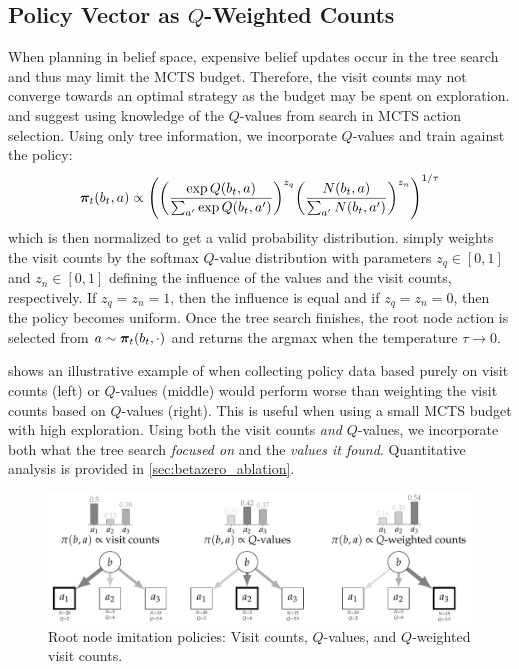 \subsection{Policy Vector as \texorpdfstring{$Q$}{Q}-Weighted Counts}
When planning in belief space, expensive belief updates occur in the tree search and thus may limit the MCTS budget.
Therefore, the visit counts may not converge towards an optimal strategy as the budget may be spent on exploration.
\textcite{danihelka2022policy} and \textcite{czech2021improving} suggest using knowledge of the $Q$-values from search in MCTS action selection.
Using only tree information, we incorporate $Q$-values and train against the policy:
\begin{equation}
    \boldsymbol\pi_t(b_t, a) \propto \Biggl(\biggl(\frac{\exp Q(b_t, a)}{\sum_{a'} \exp Q(b_t, a')}\biggr)^{z_q}\biggl(\frac{N(b_t,a)}{\sum_{a'} N(b_t,a')}\biggr)^{z_n}\Biggr)^{1/\tau}\label{eq:policy_q_weight}
\end{equation}
which is then normalized to get a valid probability distribution.
 simply weights the visit counts by the softmax $Q$-value distribution with parameters $z_q \in [0,1]$ and $z_n \in [0,1]$ defining the influence of the values and the visit counts, respectively.
If $z_q=z_n=1$, then the influence is equal and if $z_q=z_n=0$, then the policy becomes uniform.
Once the tree search finishes, the root node action is selected from $a \sim \boldsymbol\pi_t(b_t, \cdot)$ and returns the argmax when the temperature $\tau \to 0$.

 shows an illustrative example of when collecting policy data based purely on visit counts (left) or $Q$-values (middle) would perform worse than weighting the visit counts based on $Q$-values (right).
This is useful when using a small MCTS budget with high exploration.
Using both the visit counts \textit{and} $Q$-values, we incorporate both what the tree search \textit{focused on} and the \textit{values it found}.
Quantitative analysis is provided in \cref{sec:betazero_ablation}.

\begin{figure}[t!]
    \centering
    \includegraphics[width=\linewidth]{diagrams/betazero/q-weighting-diagram.pdf}
    \caption{Root node imitation policies: Visit counts, $Q$-values, and $Q$-weighted visit counts.}
    \label{fig:q-weighting}
\end{figure}

